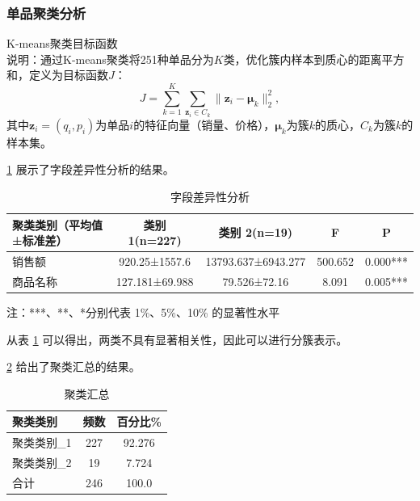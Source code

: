 \documentclass{cumcmthesis} %
\begin{document}
\subsubsection{单品聚类分析}

K-means聚类目标函数 \\
   说明：通过K-means聚类将251种单品分为$K$类，优化簇内样本到质心的距离平方和，定义为目标函数$J$：
   \begin{equation}
   J = \sum_{k=1}^K \sum_{\boldsymbol{z}_i \in C_k} \|\boldsymbol{z}_i - \boldsymbol{\mu}_k\|_2^2,
   \end{equation}
   其中$\boldsymbol{z}_i = (q_i, p_i)$为单品$i$的特征向量（销量、价格），$\boldsymbol{\mu}_k$为簇$k$的质心，$C_k$为簇$k$的样本集。

   \ref{tab:field_difference} 展示了字段差异性分析的结果。
   \begin{table}[H]
       \centering
       \caption{字段差异性分析}
       \label{tab:field_difference}
       \begin{tabular}{lcccc}
           \toprule
           聚类类别（平均值±标准差） & 类别 1(n=227) & 类别 2(n=19) & F & P \\
           \midrule
           销售额 & 920.25±1557.6 & 13793.637±6943.277 & 500.652 & 0.000*** \\
           商品名称 & 127.181±69.988 & 79.526±72.16 & 8.091 & 0.005*** \\
           \bottomrule
       \end{tabular}
       \vspace{0.2cm}
       \footnotesize{注：***、**、*分别代表 1\%、5\%、10\% 的显著性水平}
   \end{table}
   
   从表 \ref{tab:field_difference} 可以得出，两类不具有显著相关性，因此可以进行分簇表示。
   
   \ref{tab:cluster_summary} 给出了聚类汇总的结果。
\begin{table}[H]
    \centering
    \caption{聚类汇总}
    \label{tab:cluster_summary}
    \begin{tabular}{lcc}
        \toprule
        聚类类别 & 频数 & 百分比\% \\
        \midrule
        聚类类别\_1 & 227 & 92.276 \\
        聚类类别\_2 & 19 & 7.724 \\
        合计 & 246 & 100.0 \\
        \bottomrule
    \end{tabular}
\end{table}
   
\end{document}
